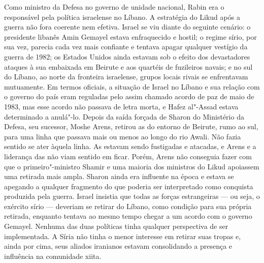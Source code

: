 Como ministro da Defesa no governo de unidade nacional, Rabin era o
responsável pela política israelense no Líbano. A estratégia do Likud
após a guerra não fora coerente nem efetiva. Israel se viu diante
do seguinte cenário: o presidente libanês Amin Gemayel estava
enfraquecido e hostil; o regime sírio, por sua vez, parecia cada vez
mais confiante e tentava apagar qualquer vestígio da guerra de 1982; os
Estados Unidos ainda estavam sob o efeito dos devastadores ataques à sua
embaixada em Beirute e aos quartéis de fuzileiros navais; e no sul do
Líbano, ao norte da fronteira israelense, grupos locais rivais se
enfrentavam mutuamente. Em termos oficiais, a situação de Israel no
Líbano e sua relação com o governo do país eram reguladas pelo assim
chamado acordo de paz de maio de 1983, mas esse acordo não passava de
letra morta, e Hafez al"-Assad estava determinado a anulá"-lo. Depois da
saída forçada de Sharon do Ministério da Defesa, seu sucessor, Moshe
Arens, retirou as  do entorno de Beirute, rumo ao sul, para uma linha
que passava mais ou menos ao longo do rio Awali. Não fazia sentido se
ater àquela linha. As  estavam sendo fustigadas e atacadas, e Arens e
a liderança das  não viam sentido em ficar. Porém, Arens não
conseguia fazer com que o primeiro"-ministro Shamir e uma maioria dos
ministros do Likud apoiassem uma retirada mais ampla. Sharon ainda era
influente na época e estava se apegando a qualquer fragmento do que
poderia ser interpretado como conquista produzida pela guerra. Israel
insistia que todas as forças estrangeiras --- ou seja, o exército sírio
--- deveriam se retirar do Líbano, como condição para sua própria
retirada, enquanto tentava ao mesmo tempo chegar a um acordo com o
governo Gemayel. Nenhuma das duas políticas tinha qualquer perspectiva
de ser implementada. A Síria não tinha o menor interesse em retirar suas
tropas e, ainda por cima, seus aliados iranianos estavam consolidando a
presença e influência na comunidade xiita.

